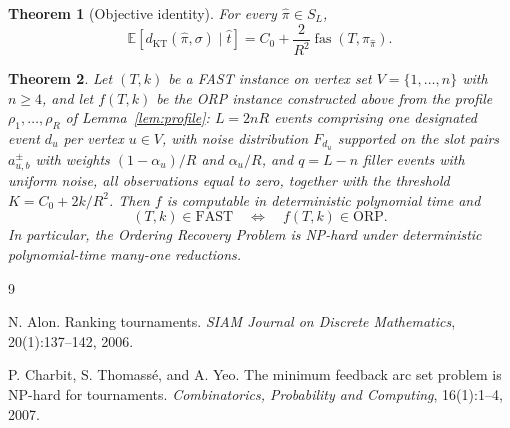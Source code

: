 \documentclass[11pt]{article}
\newtheorem{theorem}{Theorem}
\newcommand{\E}{\mathbb{E}}
\newcommand{\KT}{\operatorname{KT}}
\newcommand{\fas}{\operatorname{fas}}
\begin{document}
\begin{theorem}[Objective identity]\label{thm:objident}
For every $\hat\pi\in S_L$,
\begin{equation}
  \E\left[d_{\KT}(\hat\pi,\sigma)\mid \hat t\right]
  =C_0+\frac2{R^2}\fas(T,\pi_{\hat\pi}).
  \label{eq:objective-identity}
\end{equation}
\end{theorem}

\begin{theorem}
Let $(T,k)$ be a FAST instance on vertex set $V=\{1,\ldots,n\}$ with $n\ge 4$, and let $f(T,k)$ be the ORP instance constructed above from the profile $\rho_1,\ldots,\rho_R$ of Lemma~\ref{lem:profile}: $L=2nR$ events comprising one designated event $d_u$ per vertex $u\in V$, with noise distribution $F_{d_u}$ supported on the slot pairs $a^{\pm}_{u,b}$ with weights $(1-\alpha_u)/R$ and $\alpha_u/R$, and $q=L-n$ filler events with uniform noise, all observations equal to zero, together with the threshold $K=C_0+2k/R^2$.  Then $f$ is computable in deterministic polynomial time and
\begin{equation}
  (T,k)\in\mathrm{FAST}
  \quad\Longleftrightarrow\quad
  f(T,k)\in\mathrm{ORP}.
\end{equation}
In particular, the Ordering Recovery Problem is NP-hard under deterministic polynomial-time many-one reductions.
\end{theorem}

\begin{thebibliography}{9}

N. Alon.
\newblock Ranking tournaments.
\newblock \emph{SIAM Journal on Discrete Mathematics}, 20(1):137--142, 2006.

P. Charbit, S. Thomass\'e, and A. Yeo.
\newblock The minimum feedback arc set problem is NP-hard for tournaments.
\newblock \emph{Combinatorics, Probability and Computing}, 16(1):1--4, 2007.

\end{thebibliography}
\end{document}
